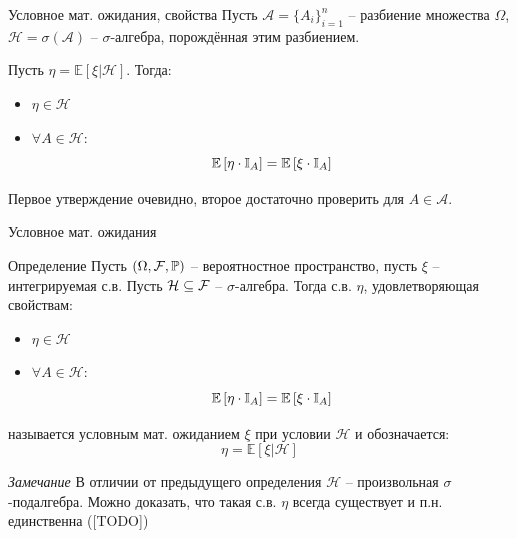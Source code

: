 \documentclass{beamer}
\begin{document}
\begin{frame}{Условное мат. ожидания, свойства}
    Пусть $\mathcal{A} = \{A_i\}_{i=1}^n$ -- разбиение множества $\Omega$, $\mathcal{H} = \sigma(\mathcal{A})$ -- $\sigma$-алгебра, порождённая этим разбиением.

    Пусть $\eta = \mathbb{E}\left[ \xi | \mathcal{H} \right]$. Тогда:
    \begin{itemize}
        \item $\eta \in \mathcal{H}$
        \item $\forall A\in \mathcal{H}$:
        $$
            \mathbb{E} \left[ \eta \cdot \mathbb{I}_{A} \right] = \mathbb{E} \left[ \xi \cdot \mathbb{I}_A \right]
        $$
    \end{itemize}
    Первое утверждение очевидно, второе достаточно проверить для $A\in \mathcal{A}$.
\end{frame}

\begin{frame}{Условное мат. ожидания}
    \begin{block}{Определение}
        Пусть $(\Omega, \mathcal{F}, \mathbb{P})$ -- вероятностное пространство, пусть $\xi$ -- интегрируемая с.в. Пусть $\mathcal{H} \subseteq \mathcal{F}$ -- $\sigma$-алгебра. Тогда с.в. $\eta$, удовлетворяющая свойствам:
    \begin{itemize}
        \item $\eta \in \mathcal{H}$
        \item $\forall A\in \mathcal{H}$:
        $$
            \mathbb{E} \left[ \eta \cdot \mathbb{I}_{A} \right] = \mathbb{E} \left[ \xi \cdot \mathbb{I}_A \right]
        $$
    \end{itemize} называется условным мат. ожиданием $\xi$ при условии $\mathcal{H}$ и обозначается:
    $$
        \eta = \mathbb{E}\left[ \xi | \mathcal{H} \right]
    $$
    \end{block}
    \textit{Замечание} 
    В отличии от предыдущего определения $\mathcal{H}$ -- произвольная $\sigma$-подалгебра. Можно доказать, что такая с.в. $\eta$ всегда существует и п.н. единственна ([TODO])
\end{frame}
\end{document}
